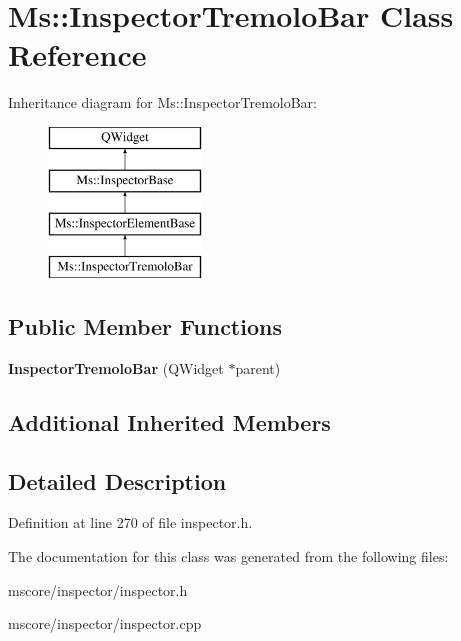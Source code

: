 \hypertarget{class_ms_1_1_inspector_tremolo_bar}{}\section{Ms\+:\+:Inspector\+Tremolo\+Bar Class Reference}
\label{class_ms_1_1_inspector_tremolo_bar}
Inheritance diagram for Ms\+:\+:Inspector\+Tremolo\+Bar\+:\begin{figure}[H]
\begin{center}
\leavevmode
\includegraphics[height=4.000000cm]{class_ms_1_1_inspector_tremolo_bar}
\end{center}
\end{figure}
\subsection*{Public Member Functions}
\begin{DoxyCompactItemize}
\item 
\mbox{\label{class_ms_1_1_inspector_tremolo_bar_a86125f572a2202c86f180af169b880eb}} 
{\bfseries Inspector\+Tremolo\+Bar} (Q\+Widget $\ast$parent)
\end{DoxyCompactItemize}
\subsection*{Additional Inherited Members}


\subsection{Detailed Description}


Definition at line 270 of file inspector.\+h.



The documentation for this class was generated from the following files\+:\begin{DoxyCompactItemize}
\item 
mscore/inspector/inspector.\+h\item 
mscore/inspector/inspector.\+cpp\end{DoxyCompactItemize}
